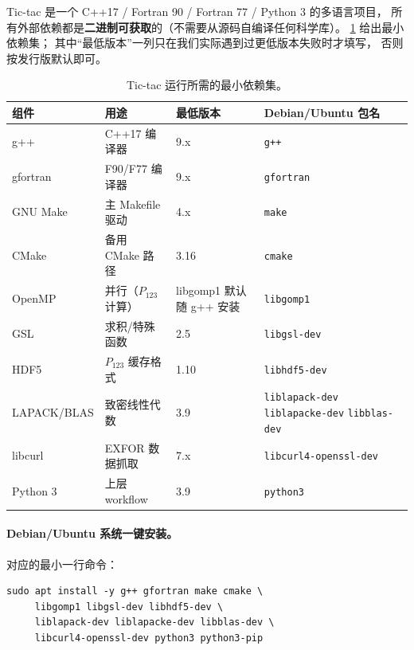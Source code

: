 Tic-tac 是一个 C++17 / Fortran 90 / Fortran 77 / Python 3 的多语言项目，
所有外部依赖都是\textbf{二进制可获取}的（不需要从源码自编译任何科学库）。
\cref{tab:ch20-deps} 给出最小依赖集；
其中“最低版本”一列只在我们实际遇到过更低版本失败时才填写，
否则按发行版默认即可。

\begin{table}[ht]
\centering
\small
\caption{Tic-tac 运行所需的最小依赖集。}
\label{tab:ch20-deps}
\begin{tabular}{@{}llll@{}}
\toprule
组件 & 用途 & 最低版本 & Debian/Ubuntu 包名 \\
\midrule
g++           & C++17 编译器           & 9.x  & \texttt{g++} \\
gfortran      & F90/F77 编译器         & 9.x  & \texttt{gfortran} \\
GNU Make      & 主 Makefile 驱动       & 4.x  & \texttt{make} \\
CMake         & 备用 CMake 路径        & 3.16 & \texttt{cmake} \\
OpenMP        & 并行（$P_{123}$ 计算） & libgomp1 默认随 g++ 安装 & \texttt{libgomp1} \\
GSL           & 求积/特殊函数          & 2.5  & \texttt{libgsl-dev} \\
HDF5          & $P_{123}$ 缓存格式     & 1.10 & \texttt{libhdf5-dev} \\
LAPACK/BLAS   & 致密线性代数           & 3.9  & \texttt{liblapack-dev} \texttt{liblapacke-dev} \texttt{libblas-dev} \\
libcurl       & EXFOR 数据抓取         & 7.x  & \texttt{libcurl4-openssl-dev} \\
Python 3      & 上层 workflow          & 3.9  & \texttt{python3} \\
\bottomrule
\end{tabular}
\end{table}

\paragraph{Debian/Ubuntu 系统一键安装。}
对应的最小一行命令：
\begin{lstlisting}[style=config,caption={Debian/Ubuntu 依赖安装。}]
sudo apt install -y g++ gfortran make cmake \
     libgomp1 libgsl-dev libhdf5-dev \
     liblapack-dev liblapacke-dev libblas-dev \
     libcurl4-openssl-dev python3 python3-pip
\end{lstlisting}

